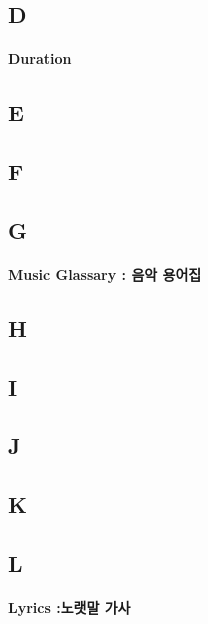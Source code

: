 \documentclass[12pt, a4paper, oneside]{book}
\begin{document}
	\subsection{D}

\paragraph{Duration}


	\subsection{E}

	\subsection{F}

	\subsection{G}

\paragraph{Music Glassary : 음악 용어집}



	\subsection{H}

	\subsection{I}


	\subsection{J}


	\subsection{K}

	\subsection{L}

\paragraph{Lyrics :노랫말 가사}
\end{document}
